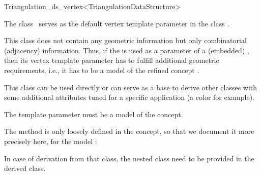 \begin{ccRefClass}{Triangulation_ds_vertex<TriangulationDataStructure>}

\ccDefinition

The class \ccRefName\ serves as the default vertex template parameter in the
class .

This class does not contain any geometric information but only combinatorial
(adjacency) information. Thus, if the  is
used as a parameter of a (embedded) , then its vertex template parameter
has to fulfill additional geometric requirements, {i.e.}, it has to be a
model of the refined concept .

This class can be used directly or can serve as a base to derive other classes
with some additional attributes tuned for a specific application (a color for
example).


\ccParameters

The template parameter  must be a model of the
 concept.

\ccIsModel



\begin{ccDebug}

The  method is only loosely defined in the
 concept, so that we document it more precisely
here, for the model \ccRefName:

\end{ccDebug}

\begin{ccAdvanced}
In case of derivation from that class, the nested class
 need to be provided in the derived class.
\end{ccAdvanced}



\ccSeeAlso

\\
\end{ccRefClass}
